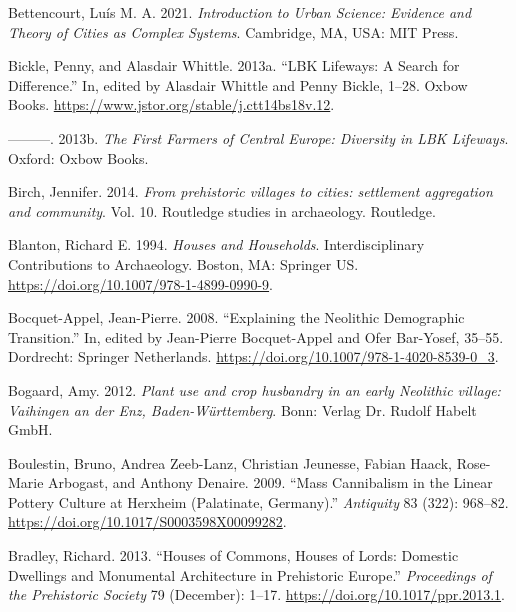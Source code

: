 \documentclass[
  12pt,
  a4paper, twoside]{book}
\newlength{\cslhangindent}
\newlength{\cslentryspacingunit} %
\newenvironment{CSLReferences}[2] %
 {%
  \setlength{\parindent}{0pt}
  \ifodd #1
  \let\oldpar\par
  \def\par{\hangindent=\cslhangindent\oldpar}
  \fi
  \setlength{\parskip}{#2\cslentryspacingunit}
 }%
 {}
\begin{document}
\begin{CSLReferences}{1}{0}
\leavevmode{}%
Bettencourt, Luís M. A. 2021. \emph{Introduction to Urban Science: Evidence and Theory of Cities as Complex Systems}. Cambridge, MA, USA: MIT Press.

\leavevmode{}%
Bickle, Penny, and Alasdair Whittle. 2013a. {``LBK Lifeways: A Search for Difference.''} In, edited by Alasdair Whittle and Penny Bickle, 1--28. Oxbow Books. \url{https://www.jstor.org/stable/j.ctt14bs18v.12}.

\leavevmode{}%
---------. 2013b. \emph{The First Farmers of Central Europe: Diversity in LBK Lifeways}. Oxford: Oxbow Books.

\leavevmode{}%
Birch, Jennifer. 2014. \emph{From prehistoric villages to cities: settlement aggregation and community}. Vol. 10. Routledge studies in archaeology. Routledge.

\leavevmode{}%
Blanton, Richard E. 1994. \emph{Houses and Households}. Interdisciplinary Contributions to Archaeology. Boston, MA: Springer US. \url{https://doi.org/10.1007/978-1-4899-0990-9}.

\leavevmode{}%
Bocquet-Appel, Jean-Pierre. 2008. {``Explaining the Neolithic Demographic Transition.''} In, edited by Jean-Pierre Bocquet-Appel and Ofer Bar-Yosef, 35--55. Dordrecht: Springer Netherlands. \url{https://doi.org/10.1007/978-1-4020-8539-0_3}.

\leavevmode{}%
Bogaard, Amy. 2012. \emph{Plant use and crop husbandry in an early Neolithic village: Vaihingen an der Enz, Baden-Württemberg}. Bonn: Verlag Dr. Rudolf Habelt GmbH.

\leavevmode{}%
Boulestin, Bruno, Andrea Zeeb-Lanz, Christian Jeunesse, Fabian Haack, Rose-Marie Arbogast, and Anthony Denaire. 2009. {``Mass Cannibalism in the Linear Pottery Culture at Herxheim (Palatinate, Germany).''} \emph{Antiquity} 83 (322): 968--82. \url{https://doi.org/10.1017/S0003598X00099282}.

\leavevmode{}%
Bradley, Richard. 2013. {``Houses of Commons, Houses of Lords: Domestic Dwellings and Monumental Architecture in Prehistoric Europe.''} \emph{Proceedings of the Prehistoric Society} 79 (December): 1--17. \url{https://doi.org/10.1017/ppr.2013.1}.


\end{CSLReferences}
\end{document}
